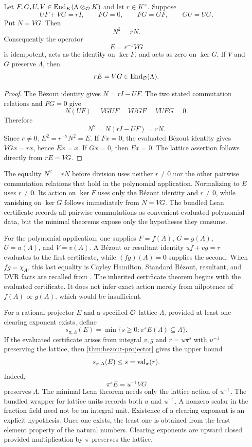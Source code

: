 \begin{theorem}\label{thm:bezout-projector}
Let $F,G,U,V\in\operatorname{End}_K(\Lambda\otimes_{\mathcal O} K)$ and let $r\in K^\times$.
Suppose
\[
UF+VG=rI,
\qquad FG=0,
\qquad FG=GF,
\qquad GU=UG.
\]
Put $N=VG$. Then
\[
\boxed{N^2=rN.}
\]
Consequently the operator
\[
\boxed{
E=r^{-1}VG
}
\]
is idempotent, acts as the identity on $\ker F$, and acts as zero on
$\ker G$. If $V$ and $G$ preserve $\Lambda$, then
\[
rE=VG\in\operatorname{End}_{\mathcal O}(\Lambda).
\]
\end{theorem}

\begin{proof}
The B\'ezout identity gives $N=rI-UF$. The two stated commutation relations
and $FG=0$ give
\[
N(UF)=VGUF=VUGF=VUFG=0.
\]
Therefore
\[
N^2=N(rI-UF)=rN.
\]
Since $r\ne0$, $E^2=r^{-2}N^2=E$. If $Fx=0$, the evaluated B\'ezout
identity gives $VGx=rx$, hence $Ex=x$. If $Gx=0$, then $Ex=0$.
The lattice assertion follows directly from $rE=VG$.
\end{proof}

The equality $N^2=rN$ before division uses neither $r\ne0$ nor the other
pairwise commutation relations that hold in the polynomial application.
Normalizing to $E$ uses $r\ne0$. Its action on $\ker F$ uses only the B\'ezout
identity and $r\ne0$, while vanishing on $\ker G$ follows immediately from $N=VG$.
The bundled Lean certificate records all pairwise commutations as convenient
evaluated polynomial data, but the minimal theorems expose only the hypotheses
they consume.

For the polynomial application, one supplies $F=f(A)$, $G=g(A)$,
$U=u(A)$, and $V=v(A)$. A B\'ezout or resultant identity
$uf+vg=r$ evaluates to the first certificate, while
$(fg)(A)=0$ supplies the second. When $fg=\chi_A$, this last equality is
Cayley Hamilton. Standard B\'ezout, resultant, and DVR facts are recalled
from \cite{Lang2002,Serre1979}. The inherited certificate theorem begins with the evaluated
certificate. It does not infer exact action merely from nilpotence of
$f(A)$ or $g(A)$, which would be insufficient.

\begin{definition}\label{def:separation-weight}
For a rational projector $E$ and a specified ${\mathcal O}$ lattice $\Lambda$, provided
at least one clearing exponent exists, define
\[
s_{\pi,\Lambda}(E)
=
\min\{s\ge0:\pi^sE(\Lambda)\subseteq\Lambda\}.
\]
If the evaluated certificate arises from integral $v,g$ and
$r=u\pi^s$ with $u^{-1}$ preserving the lattice, then
\cref{thm:bezout-projector} gives the upper bound
\[
s_{\pi,\Lambda}(E)\le s=\operatorname{val}_\pi(r).
\]
Indeed,
\[
\boxed{\pi^sE=u^{-1}VG}
\]
preserves $\Lambda$. The minimal Lean theorem needs only the lattice action of
$u^{-1}$. The bundled wrapper for lattice units records both $u$ and $u^{-1}$.
A nonzero scalar in the fraction field need not be an integral unit.
Existence of a clearing exponent is an explicit hypothesis. Once one exists,
the least one is obtained from the least element property of the natural numbers.
Clearing exponents are upward closed provided multiplication by $\pi$
preserves the lattice.
\end{definition}

